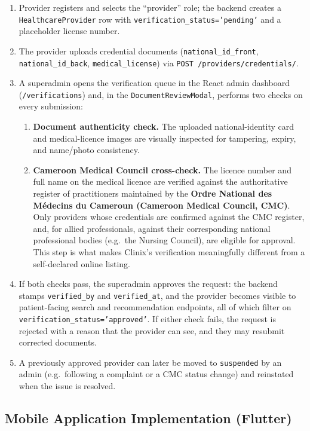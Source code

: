 \begin{enumerate}
  \item Provider registers and selects the ``provider'' role; the backend creates a \texttt{HealthcareProvider} row with \texttt{verification\_status='pending'} and a placeholder license number.
  \item The provider uploads credential documents (\texttt{national\_id\_front}, \texttt{national\_id\_back}, \texttt{medical\_license}) via \texttt{POST /providers/credentials/}.
  \item A superadmin opens the verification queue in the React admin dashboard (\texttt{/verifications}) and, in the \texttt{DocumentReviewModal}, performs two checks on every submission:
    \begin{enumerate}
      \item \textbf{Document authenticity check.} The uploaded national-identity card and medical-licence images are visually inspected for tampering, expiry, and name/photo consistency.
      \item \textbf{Cameroon Medical Council cross-check.} The licence number and full name on the medical licence are verified against the authoritative register of practitioners maintained by the \textbf{Ordre National des M\'edecins du Cameroun (Cameroon Medical Council, CMC)}. Only providers whose credentials are confirmed against the CMC register, and, for allied professionals, against their corresponding national professional bodies (e.g.\ the Nursing Council), are eligible for approval. This step is what makes Clinix's verification meaningfully different from a self-declared online listing.
    \end{enumerate}
  \item If both checks pass, the superadmin approves the request: the backend stamps \texttt{verified\_by} and \texttt{verified\_at}, and the provider becomes visible to patient-facing search and recommendation endpoints, all of which filter on \texttt{verification\_status='approved'}. If either check fails, the request is rejected with a reason that the provider can see, and they may resubmit corrected documents.
  \item A previously approved provider can later be moved to \texttt{suspended} by an admin (e.g.\ following a complaint or a CMC status change) and reinstated when the issue is resolved.
\end{enumerate}

\subsection{Mobile Application Implementation (Flutter)}

